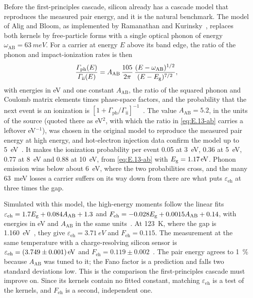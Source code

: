 Before the first-principles cascade, silicon already has a cascade model that reproduces the measured pair energy, and it is the natural benchmark. The model of Alig and Bloom, as implemented by Ramanathan and Kurinsky~\cite{ramanathan2020ionization}, replaces both kernels by free-particle forms with a single optical phonon of energy $\omega_{\mathrm{AB}} = \SI{63}{meV}$. For a carrier at energy $E$ above its band edge, the ratio of the phonon and impact-ionization rates is then~\cite[Eq.~(8)]{ramanathan2020ionization}
\begin{equation}
  \frac{\varGamma_{\mathrm{ph}}(E)}{\varGamma_{\mathrm{ii}}(E)} = A_{\mathrm{AB}}\,\frac{105}{2\pi}\,\frac{(E - \omega_{\mathrm{AB}})^{1/2}}{(E - E_{\mathrm{g}})^{7/2}} ,
  \label{eq:E.13-ab}
\end{equation}
with energies in eV and one constant $A_{\mathrm{AB}}$, the ratio of the squared phonon and Coulomb matrix elements times phase-space factors, and the probability that the next event is an ionization is $[1 + \varGamma_{\mathrm{ph}}/\varGamma_{\mathrm{ii}}]^{-1}$~\cite[Eq.~(10)]{ramanathan2020ionization}. The value $A_{\mathrm{AB}} = 5.2$, in the units of the source (quoted there as eV$^2$, with which the ratio in \cref{eq:E.13-ab} carries a leftover eV$^{-1}$), was chosen in the original model to reproduce the measured pair energy at high energy, and hot-electron injection data confirm the model up to \SI{5}{eV}~\cite[Sect.~II and Table~1]{ramanathan2020ionization}. It makes the ionization probability per event 0.05 at \SI{3}{eV}, 0.36 at \SI{5}{eV}, 0.77 at \SI{8}{eV} and 0.88 at \SI{10}{eV}, from \cref{eq:E.13-ab} with $E_{\mathrm{g}} = \SI{1.17}{eV}$. Phonon emission wins below about \SI{6}{eV}, where the two probabilities cross, and the many \SI{63}{meV} losses a carrier suffers on its way down from there are what puts $\varepsilon_{\mathrm{eh}}$ at three times the gap.

Simulated with this model, the high-energy moments follow the linear fits $\varepsilon_{\mathrm{eh}} = 1.7E_{\mathrm{g}} + 0.084A_{\mathrm{AB}} + 1.3$ and $F_{\mathrm{eh}} = -0.028E_{\mathrm{g}} + 0.0015A_{\mathrm{AB}} + 0.14$, with energies in eV and $A_{\mathrm{AB}}$ in the same units~\cite[Eqs.~(12)--(13)]{ramanathan2020ionization}. At \SI{123}{K}, where the gap is \SI{1.160}{eV}~\cite[Eq.~(11)]{ramanathan2020ionization}, they give $\varepsilon_{\mathrm{eh}} = \SI{3.71}{eV}$ and $F_{\mathrm{eh}} = 0.115$. The measurement at the same temperature with a charge-resolving silicon sensor is $\varepsilon_{\mathrm{eh}} = \SI{3.749 \pm 0.001}{eV}$ and $F_{\mathrm{eh}} = 0.119 \pm 0.002$~\cite{rodrigues2021absolute}. The pair energy agrees to \SI{1}{\percent} because $A_{\mathrm{AB}}$ was tuned to it; the Fano factor is a prediction and falls two standard deviations low. This is the comparison the first-principles cascade must improve on. Since its kernels contain no fitted constant, matching $\varepsilon_{\mathrm{eh}}$ is a test of the kernels, and $F_{\mathrm{eh}}$ is a second, independent one.


